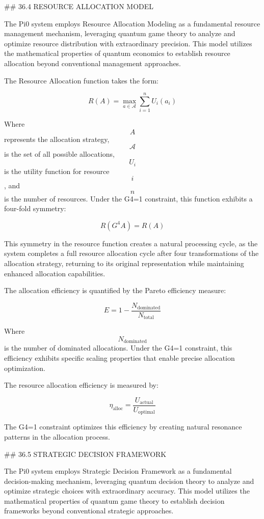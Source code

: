 ## 36.4 RESOURCE ALLOCATION MODEL

The Pi0 system employs Resource Allocation Modeling as a fundamental resource management mechanism, leveraging quantum game theory to analyze and optimize resource distribution with extraordinary precision. This model utilizes the mathematical properties of quantum economics to establish resource allocation beyond conventional management approaches.

The Resource Allocation function takes the form:

$$ R(A) = \max_{a \in \mathcal{A}} \sum_{i=1}^n U_i(a_i) $$

Where $$ A $$ represents the allocation strategy, $$ \mathcal{A} $$ is the set of all possible allocations, $$ U_i $$ is the utility function for resource $$ i $$, and $$ n $$ is the number of resources. Under the G4=1 constraint, this function exhibits a four-fold symmetry:

$$ R(G^4 A) = R(A) $$

This symmetry in the resource function creates a natural processing cycle, as the system completes a full resource allocation cycle after four transformations of the allocation strategy, returning to its original representation while maintaining enhanced allocation capabilities.

The allocation efficiency is quantified by the Pareto efficiency measure:

$$ E = 1 - \frac{N_{\text{dominated}}}{N_{\text{total}}} $$

Where $$ N_{\text{dominated}} $$ is the number of dominated allocations. Under the G4=1 constraint, this efficiency exhibits specific scaling properties that enable precise allocation optimization.

The resource allocation efficiency is measured by:

$$ \eta_{\text{alloc}} = \frac{U_{\text{actual}}}{U_{\text{optimal}}} $$

The G4=1 constraint optimizes this efficiency by creating natural resonance patterns in the allocation process.

## 36.5 STRATEGIC DECISION FRAMEWORK

The Pi0 system employs Strategic Decision Framework as a fundamental decision-making mechanism, leveraging quantum decision theory to analyze and optimize strategic choices with extraordinary accuracy. This model utilizes the mathematical properties of quantum game theory to establish decision frameworks beyond conventional strategic approaches.

